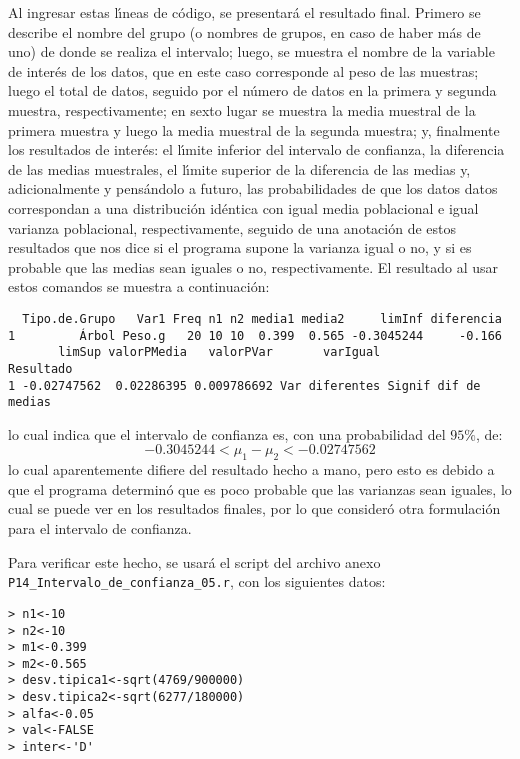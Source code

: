 \begin{solucion}
 Al ingresar estas l\'{\i}neas de c\'odigo, se presentar\'a el resultado final. Primero se describe el nombre del grupo (o nombres de grupos, en caso de haber m\'as de uno) de donde se realiza el intervalo; luego, se muestra el nombre de la variable de inter\'es de los datos, que en este caso corresponde al peso de las muestras; luego el total de datos, seguido por el n\'umero de datos en la primera y segunda muestra, respectivamente; en sexto lugar se muestra la media muestral de la primera muestra y luego la media muestral de la segunda muestra; y, finalmente los resultados de inter\'es: el l\'{\i}mite inferior del intervalo de confianza, la diferencia de las medias muestrales, el l\'{\i}mite superior de la diferencia de las medias y, adicionalmente y pens\'andolo a futuro, las probabilidades de que los datos datos correspondan a una distribuci\'on id\'entica con igual media poblacional e igual varianza poblacional, respectivamente, seguido de una anotaci\'on de estos resultados que nos dice si el programa supone la varianza igual o no, y si es probable que las medias sean iguales o no, respectivamente. El resultado al usar estos comandos se muestra a continuaci\'on:
 \begin{verbatim}
  Tipo.de.Grupo   Var1 Freq n1 n2 media1 media2     limInf diferencia
1         Árbol Peso.g   20 10 10  0.399  0.565 -0.3045244     -0.166
       limSup valorPMedia   valorPVar       varIgual            Resultado
1 -0.02747562  0.02286395 0.009786692 Var diferentes Signif dif de medias
 \end{verbatim}
 \vspace{-0.5cm}
 lo cual indica que el intervalo de confianza es, con una probabilidad del $95\%$, de:
 \begin{equation*}
  -0.3045244 < \mu_1 - \mu_2 < -0.02747562
 \end{equation*}
 lo cual aparentemente difiere del resultado hecho a mano, pero esto es debido a que el programa determin\'o que es poco probable que las varianzas sean iguales, lo cual se puede ver en los resultados finales, por lo que consider\'o otra formulaci\'on para el intervalo de confianza.
 \par 
 Para verificar este hecho, se usar\'a el script del archivo anexo \texttt{P14\_Intervalo\_de\_confianza\_05.r}, con los siguientes datos:
 \begin{verbatim}
> n1<-10
> n2<-10
> m1<-0.399
> m2<-0.565
> desv.tipica1<-sqrt(4769/900000)
> desv.tipica2<-sqrt(6277/180000)
> alfa<-0.05
> val<-FALSE
> inter<-'D'
 \end{verbatim}

\end{solucion}
